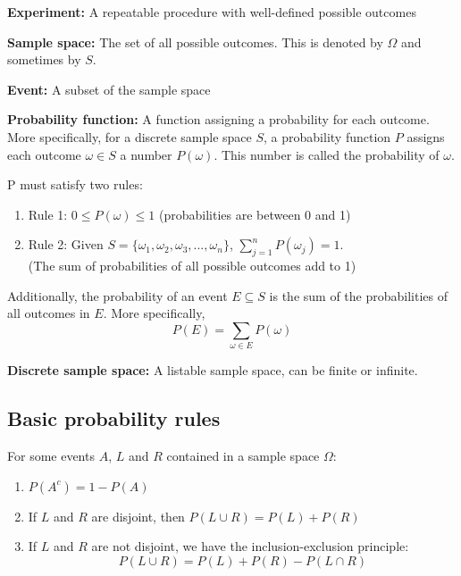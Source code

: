 \documentclass{article}
\begin{document}
\textbf{Experiment:} A repeatable procedure with well-defined possible outcomes 

\vspace{2 mm}

\noindent
\textbf{Sample space:} The set of all possible outcomes. This is denoted by $\Omega$ and sometimes by $S$.

\vspace{2 mm}

\noindent
\textbf{Event:} A subset of the sample space

\vspace{2 mm}

\noindent
\textbf{Probability function:} A function assigning a probability for each outcome. More specifically, for a discrete sample space $S$, a probability function $P$ assigns each outcome $\omega \in S$ a number $P(\omega)$. This number is called the probability of $\omega$.

\vspace{1 mm}

\noindent
P must satisfy two rules:
\begin{enumerate}
    \item[] Rule 1: $0 \leq P(\omega) \leq 1$ (probabilities are between 0 and 1)
    \item[] Rule 2: Given $S = \{\omega_1, \omega_2, \omega_3, ..., \omega_n\}$, $\displaystyle\sum_{j = 1}^{n} P(\omega_j) = 1$. 
    \\
    (The sum of probabilities of all possible outcomes add to 1)
\end{enumerate}

\noindent
Additionally, the probability of an event $E \subseteq S$ is the sum of the probabilities of all outcomes in $E$. More specifically,
\[P(E) = \sum_{\omega \in E} P(\omega)\]

\vspace{2 mm}

\noindent
\textbf{Discrete sample space:} A listable sample space, can be finite or infinite.

\subsection{Basic probability rules}
For some events $A$, $L$ and $R$ contained in a sample space $\Omega$:

\noindent
\begin{enumerate}
    \item[] $P(A^c) = 1 - P(A)$
    \item[] If $L$ and $R$ are disjoint, then $P(L \cup R) = P(L) + P(R)$
    \item[] If $L$ and $R$ are not disjoint, we have the inclusion-exclusion principle:
    \[P(L \cup R) = P(L) + P(R) - P(L \cap R)\]
\end{enumerate}
\end{document}
